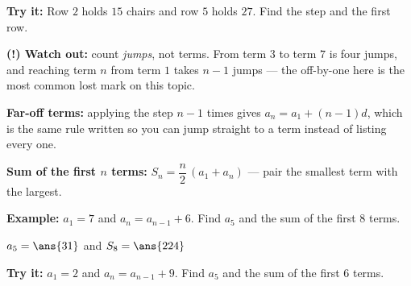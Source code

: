 \documentclass[12pt]{article}
\begin{document}
\begin{tryitbox}
\textbf{Try it:} \quad Row $2$ holds $15$ chairs and row $5$ holds $27$. Find the step and the first row.\\[2pt]
\end{tryitbox}

\begin{watchoutbox}
\textbf{(!) Watch out:} count \emph{jumps}, not terms. From term $3$ to term $7$ is four jumps, and reaching term $n$ from term $1$ takes $n-1$ jumps --- the off-by-one here is the most common lost mark on this topic.
\end{watchoutbox}


\begin{formulabox}
\textbf{Far-off terms:} applying the step $n-1$ times gives $a_n = a_1 + (n-1)d$, which is the same rule written so you can jump straight to a term instead of listing every one.\par
\textbf{Sum of the first $n$ terms:} $S_n = \dfrac{n}{2}\,(a_1 + a_n)$ --- pair the smallest term with the largest.
\end{formulabox}

\begin{examplebox}
\textbf{Example:} \quad $a_1 = 7$ and $a_n = a_{n-1} + 6$. Find $a_5$ and the sum of the first $8$ terms.

$a_5 = \ans{31}$ \quad and \quad $S_8 = \ans{224}$
\end{examplebox}

\begin{tryitbox}
\textbf{Try it:} \quad $a_1 = 2$ and $a_n = a_{n-1} + 9$. Find $a_5$ and the sum of the first $6$ terms.\\[2pt]
\end{tryitbox}
\end{document}
